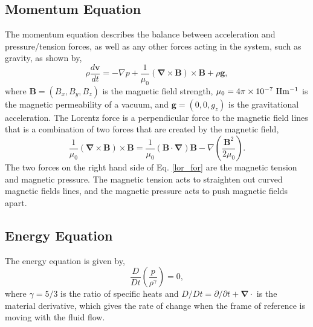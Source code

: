 \documentclass[12pt]{ociamthesis}
\newcommand{\bs}[1]{\boldsymbol{#1}}
\newcommand{\bn}{\boldsymbol{\nabla}}
\newcommand{\eref}[1]{Eq. \eqref{#1}}
\begin{document}
\subsection{Momentum Equation}
\label{section:cont_eq}
The momentum equation describes the balance between acceleration and pressure/tension forces, as well as any other forces acting in the system, such as gravity, as shown by,
\begin{equation}\label{eq87}
\rho \frac{d \boldsymbol{v}}{dt} = - \nabla p + \frac{1}{\mu_0} (\bn \times \boldsymbol{B}) \times \boldsymbol{B} + \rho \boldsymbol{g},
\end{equation}
where $\bs{B}=(B_x,B_y,B_z)$ is the magnetic field strength, $\mu_0=4 \pi \times 10^{-7}~\rm{Hm^{-1}}$ is the magnetic permeability of a vacuum, and $\bs{g} = (0,0,g_z)$ is the gravitational acceleration. The Lorentz force is a perpendicular force to the magnetic field lines that is a combination of two forces that are created by the magnetic field,
\begin{equation}\label{lor_for} 
    \frac{1}{\mu_0}(\bs{\nabla}\times \bs{B})\times \bs{B} = \frac{1}{\mu_0}( \bs{B} \cdot \bs{\nabla}) \bs{B} - \nabla\left(\frac{ \bs{B}^2}{2\mu_0}\right).
\end{equation}
The two forces on the right hand side of \eref{lor_for} are the magnetic tension and magnetic pressure. The magnetic tension acts to straighten out curved magnetic fields lines, and the magnetic pressure acts to push magnetic fields apart.    %
\subsection{Energy Equation}
\label{section:cont_eq}
The energy equation is given by, 
\begin{equation}\label{eq88}
\frac{D}{D t} \left( \frac{p}{\rho^{\gamma}} \right) = 0,
\end{equation}
where $\gamma=5/3$ is the ratio of specific heats and $D/Dt = \partial/\partial t+\bn \cdot$ is the material derivative, which gives the rate of change when the frame of reference is moving with the fluid flow.
\end{document}
